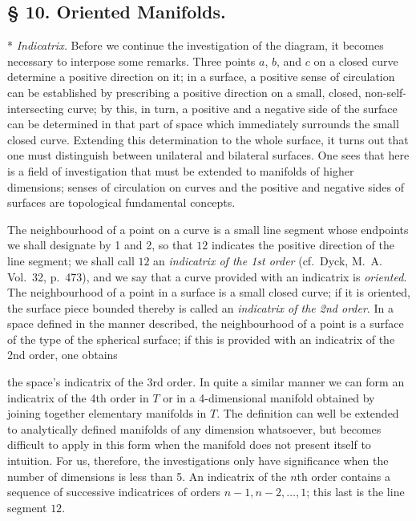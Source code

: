 \documentclass{article}
\begin{document}
\subsection*{§ 10. Oriented Manifolds.}

* \emph{Indicatrix.} Before we continue the investigation of the diagram, it becomes necessary to interpose some remarks. Three points $a$, $b$, and $c$ on a closed curve determine a positive direction on it; in a surface, a positive sense of circulation can be established by prescribing a positive direction on a small, closed, non-self-intersecting curve; by this, in turn, a positive and a negative side of the surface can be determined in that part of space which immediately surrounds the small closed curve. Extending this determination to the whole surface, it turns out that one must distinguish between unilateral and bilateral surfaces. One sees that here is a field of investigation that must be extended to manifolds of higher dimensions; senses of circulation on curves and the positive and negative sides of surfaces are topological fundamental concepts.

The neighbourhood of a point on a curve is a small line segment whose endpoints we shall designate by 1 and 2, so that $12$ indicates the positive direction of the line segment; we shall call $12$ an \emph{indicatrix of the 1st order} (cf.\ Dyck, M.~A. Vol.\ 32, p.\ 473), and we say that a curve provided with an indicatrix is \emph{oriented}. The neighbourhood of a point in a surface is a small closed curve; if it is oriented, the surface piece bounded thereby is called an \emph{indicatrix of the 2nd order}. In a space defined in the manner described, the neighbourhood of a point is a surface of the type of the spherical surface; if this is provided with an indicatrix of the 2nd order, one obtains

the space's indicatrix of the 3rd order. In quite a similar manner we can form an indicatrix of the 4th order in $T$ or in a 4-dimensional manifold obtained by joining together elementary manifolds in $T$. The definition can well be extended to analytically defined manifolds of any dimension whatsoever, but becomes difficult to apply in this form when the manifold does not present itself to intuition. For us, therefore, the investigations only have significance when the number of dimensions is less than 5. An indicatrix of the $n$th order contains a sequence of successive indicatrices of orders $n - 1, n - 2, \dots, 1$; this last is the line segment $12$.
\end{document}
